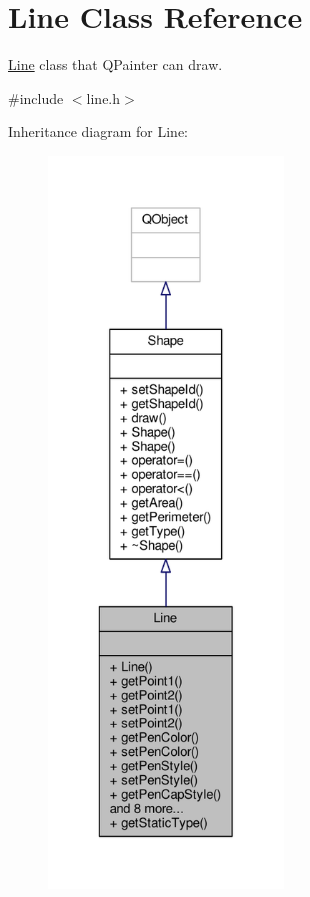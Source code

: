 \hypertarget{classLine}{}\section{Line Class Reference}
\label{classLine}


\hyperlink{classLine}{Line} class that Q\+Painter can draw.  




{\ttfamily \#include $<$line.\+h$>$}



Inheritance diagram for Line\+:\nopagebreak
\begin{figure}[H]
\begin{center}
\leavevmode
\includegraphics[height=550pt]{classLine__inherit__graph}
\end{center}
\end{figure}


